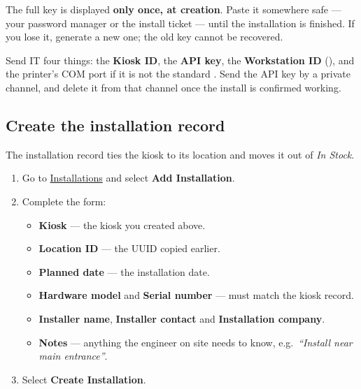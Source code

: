 \documentclass[a4paper,10pt]{article}
\begin{document}

\begin{wkwarn}
The full key is displayed \textbf{only once, at creation}. Paste it
somewhere safe --- your password manager or the install ticket --- until
the installation is finished. If you lose it, generate a new one; the old
key cannot be recovered.
\end{wkwarn}

\begin{wkinfo}
Send IT four things: the \textbf{Kiosk ID}, the \textbf{API key}, the
\textbf{Workstation ID} (), and the printer's COM port
if it is not the standard . Send the API key by a private
channel, and delete it from that channel once the install is confirmed
working.
\end{wkinfo}

\subsection{Create the installation record}

The installation record ties the kiosk to its location and moves it out of
\emph{In Stock}.

\begin{enumerate}
  \item Go to
        \href{https://command.weknow.technology/installations}{Installations}
        and select \textbf{Add Installation}.

  \item Complete the form:
    \begin{itemize}
      \item \textbf{Kiosk} --- the kiosk you created above.
      \item \textbf{Location ID} --- the UUID copied earlier.
      \item \textbf{Planned date} --- the installation date.
      \item \textbf{Hardware model} and \textbf{Serial number} --- must
            match the kiosk record.
      \item \textbf{Installer name}, \textbf{Installer contact} and
            \textbf{Installation company}.
      \item \textbf{Notes} --- anything the engineer on site needs to
            know, e.g.\ \emph{``Install near main entrance''}.
    \end{itemize}

  \item Select \textbf{Create Installation}.
\end{enumerate}
\end{document}

